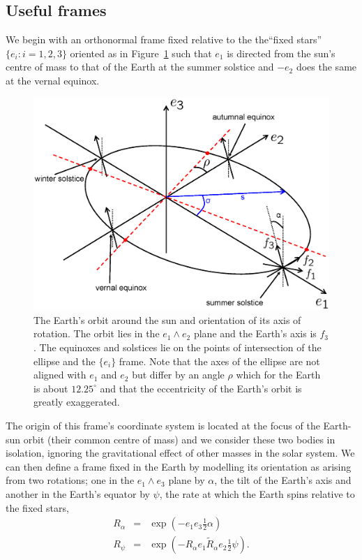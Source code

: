 \documentclass[12pt]{article}
\newcommand{\nn}{\nonumber}
\newcommand{\wdg}{\! \wedge \!}
\newcommand{\half}{{\textstyle \frac{1}{2}}}
\newcommand{\rev}[1]{\tilde{ #1 }}
\begin{document}
\subsection{Useful frames}
%
We begin with an orthonormal frame fixed relative to the the``fixed stars'' $\{e_i:i=1,2,3\}$ oriented as in Figure~\ref{universe_frame} such that $e_1$ is directed from the sun's centre of mass to that of the Earth at the summer solstice and $-e_2$ does the same at the vernal equinox. 
%
\begin{figure}[ht!]
\centering
\includegraphics[width=13cm]{figs/figure1.eps} 
\caption{The Earth's orbit around the sun and orientation of its axis of rotation. The orbit lies in the $e_1 \wdg e_2$ plane and the Earth's axis is $f_3$. The equinoxes and solstices lie on the points of intersection of the ellipse and the $\{e_i\}$ frame. Note that the axes of the ellipse are not aligned with $e_1$ and $e_2$ but differ by an angle $\rho$ which for the Earth is about $12.25^\circ$ and that the eccentricity of the Earth's orbit is greatly exaggerated.\label{universe_frame}}
\end{figure}
%
The origin of this frame's coordinate system is located at the focus of the Earth-sun orbit (their common centre of mass) and we consider these two bodies in isolation, ignoring the gravitational effect of other masses in the solar system. We can then define a frame fixed in the Earth by modelling its orientation as arising from two rotations; one in the $e_1 \wdg e_3$ plane by $\alpha$, the tilt of the Earth's axis and another in the Earth's equator by $\psi$, the rate at which the Earth spins relative to the fixed stars,
%
\begin{eqnarray}\label{fFrameRotors}
R_\alpha & = & \exp(-e_1 e_3\half\alpha) \\ \nn
R_\psi & = & \exp(-R_\alpha e_1 \rev{R}_\alpha e_2\half\psi).
\end{eqnarray}
\end{document}
